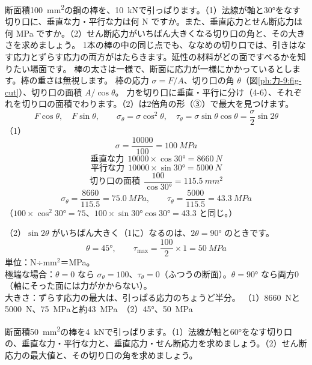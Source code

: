 \begin{phreidai}[引っぱった棒のななめの切り口]
\label{ph:力-9:ex1}断面積\qty{100}{mm^2}の鋼の棒を、\qty{10}{kN}で引っぱります。（1）法線が軸と30°をなす切り口に、垂直な力・平行な力は何 N ですか。また、垂直応力とせん断応力は何 MPa ですか。（2）せん断応力がいちばん大きくなる切り口の角と、その大きさを求めましょう。
\phbamen
1本の棒の中の同じ点でも、ななめの切り口では、引きはなす応力とずらす応力の両方がはたらきます。延性の材料がどの面ですべるかを知りたい場面です。
\phmushi
棒の太さは一様で、断面に応力が一様にかかっているとします。棒の重さは無視します。
\phzu
棒の応力 $\sigma=F/A$、切り口の角 $\theta$（図\ref{ph:力-9:fig-cut}）、切り口の面積 $A/\cos\theta$。
\phriyu
力を切り口に垂直・平行に分け（4-6）、それぞれを切り口の面積でわります。（2）は2倍角の形（③）で最大を見つけます。
\phtateru
\[F\cos\theta,\quad F\sin\theta,\qquad\sigma_\theta=\sigma\cos^2\theta,\quad\tau_\theta=\sigma\sin\theta\cos\theta=\frac{\sigma}{2}\sin2\theta\]
\phtoku
（1）
\[\sigma=\frac{\num{10000}}{100}=\qty{100}{MPa}\]
\[\text{垂直な力}\ \ \num{10000}\times\cos30°=\qty{8660}{N}\]
\[\text{平行な力}\ \ \num{10000}\times\sin30°=\qty{5000}{N}\]
\[\text{切り口の面積}\ \ \frac{100}{\cos30°}=\qty{115.5}{mm^2}\]
\[\sigma_\theta=\frac{8660}{115.5}=\qty{75.0}{MPa},\qquad\tau_\theta=\frac{5000}{115.5}=\qty{43.3}{MPa}\]
（$100\times\cos^2 30°=75$、$100\times\sin30°\cos30°=43.3$ と同じ。）\par
（2）$\sin2\theta$ がいちばん大きく（1に）なるのは、$2\theta=90°$ のときです。
\[\theta=45°,\qquad\tau_{\max}=\frac{100}{2}\times1=\qty{50}{MPa}\]
\phtashikame
単位：N÷mm$^2$＝MPa。\\
極端な場合：$\theta=0$ なら $\sigma_\theta=100$、$\tau_\theta=0$（ふつうの断面）。$\theta=90°$ なら両方0（軸にそった面には力がかからない）。\\
大きさ：ずらす応力の最大は、引っぱる応力のちょうど半分。
\kotae （1）\qty{8660}{N}と\qty{5000}{N}、\qty{75}{MPa}と約\qty{43}{MPa}　（2）45°、\qty{50}{MPa}
\end{phreidai}
\begin{jibun}
断面積\qty{50}{mm^2}の棒を\qty{4}{kN}で引っぱります。（1）法線が軸と60°をなす切り口の、垂直な力・平行な力と、垂直応力・せん断応力を求めましょう。（2）せん断応力の最大値と、その切り口の角を求めましょう。
\end{jibun}

